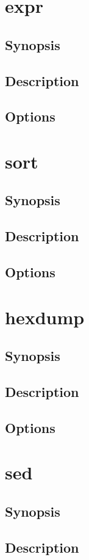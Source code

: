 \documentclass[a4paper, 10pt, onecolumn, openright, oneside]{book}
\begin{document}
		\section{expr}
			\subsection{Synopsis}
			\subsection{Description}
			\subsection{Options}
		\section{sort}
			\subsection{Synopsis}
			\subsection{Description}
			\subsection{Options}
		\section{hexdump}
			\subsection{Synopsis}
			\subsection{Description}
			\subsection{Options}
		\section{sed}
			\subsection{Synopsis}
			\subsection{Description}
\end{document}
